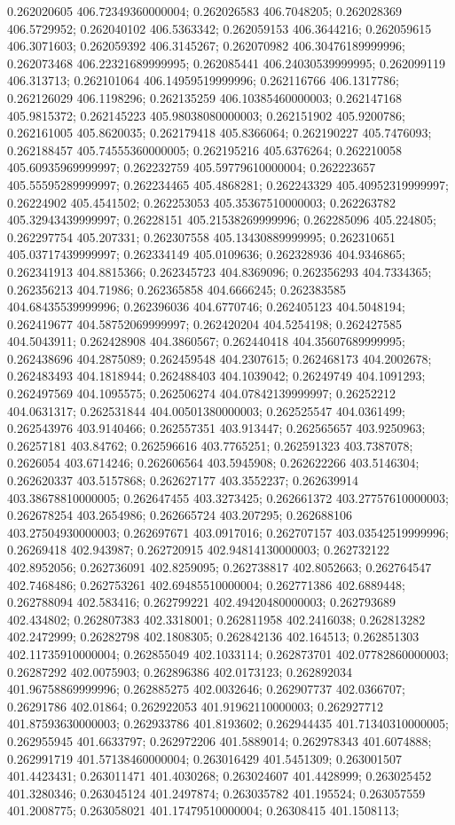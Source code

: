0.262020605 406.72349360000004; 0.262026583 406.7048205; 0.262028369 406.5729952; 0.262040102 406.5363342; 0.262059153 406.3644216; 0.262059615 406.3071603; 0.262059392 406.3145267; 0.262070982 406.30476189999996; 0.262073468 406.22321689999995; 0.262085441 406.24030539999995; 0.262099119 406.313713; 0.262101064 406.14959519999996; 0.262116766 406.1317786; 0.262126029 406.1198296; 0.262135259 406.10385460000003; 0.262147168 405.9815372; 0.262145223 405.98038080000003; 0.262151902 405.9200786; 0.262161005 405.8620035; 0.262179418 405.8366064; 0.262190227 405.7476093; 0.262188457 405.74555360000005; 0.262195216 405.6376264; 0.262210058 405.60935969999997; 0.262232759 405.59779610000004; 0.262223657 405.55595289999997; 0.262234465 405.4868281; 0.262243329 405.40952319999997; 0.26224902 405.4541502; 0.262253053 405.35367510000003; 0.262263782 405.32943439999997; 0.26228151 405.21538269999996; 0.262285096 405.224805; 0.262297754 405.207331; 0.262307558 405.13430889999995; 0.262310651 405.03717439999997; 0.262334149 405.0109636; 0.262328936 404.9346865; 0.262341913 404.8815366; 0.262345723 404.8369096; 0.262356293 404.7334365; 0.262356213 404.71986; 0.262365858 404.6666245; 0.262383585 404.68435539999996; 0.262396036 404.6770746; 0.262405123 404.5048194; 0.262419677 404.58752069999997; 0.262420204 404.5254198; 0.262427585 404.5043911; 0.262428908 404.3860567; 0.262440418 404.35607689999995; 0.262438696 404.2875089; 0.262459548 404.2307615; 0.262468173 404.2002678; 0.262483493 404.1818944; 0.262488403 404.1039042; 0.26249749 404.1091293; 0.262497569 404.1095575; 0.262506274 404.07842139999997; 0.26252212 404.0631317; 0.262531844 404.00501380000003; 0.262525547 404.0361499; 0.262543976 403.9140466; 0.262557351 403.913447; 0.262565657 403.9250963; 0.26257181 403.84762; 0.262596616 403.7765251; 0.262591323 403.7387078; 0.2626054 403.6714246; 0.262606564 403.5945908; 0.262622266 403.5146304; 0.262620337 403.5157868; 0.262627177 403.3552237; 0.262639914 403.38678810000005; 0.262647455 403.3273425; 0.262661372 403.27757610000003; 0.262678254 403.2654986; 0.262665724 403.207295; 0.262688106 403.27504930000003; 0.262697671 403.0917016; 0.262707157 403.03542519999996; 0.26269418 402.943987; 0.262720915 402.94814130000003; 0.262732122 402.8952056; 0.262736091 402.8259095; 0.262738817 402.8052663; 0.262764547 402.7468486; 0.262753261 402.69485510000004; 0.262771386 402.6889448; 0.262788094 402.583416; 0.262799221 402.49420480000003; 0.262793689 402.434802; 0.262807383 402.3318001; 0.262811958 402.2416038; 0.262813282 402.2472999; 0.26282798 402.1808305; 0.262842136 402.164513; 0.262851303 402.11735910000004; 0.262855049 402.1033114; 0.262873701 402.07782860000003; 0.26287292 402.0075903; 0.262896386 402.0173123; 0.262892034 401.96758869999996; 0.262885275 402.0032646; 0.262907737 402.0366707; 0.26291786 402.01864; 0.262922053 401.91962110000003; 0.262927712 401.87593630000003; 0.262933786 401.8193602; 0.262944435 401.71340310000005; 0.262955945 401.6633797; 0.262972206 401.5889014; 0.262978343 401.6074888; 0.262991719 401.57138460000004; 0.263016429 401.5451309; 0.263001507 401.4423431; 0.263011471 401.4030268; 0.263024607 401.4428999; 0.263025452 401.3280346; 0.263045124 401.2497874; 0.263035782 401.195524; 0.263057559 401.2008775; 0.263058021 401.17479510000004; 0.26308415 401.1508113; 